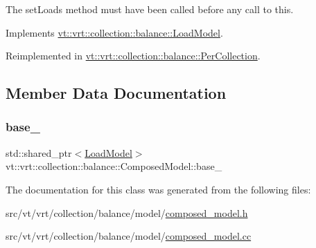 The {\ttfamily set\+Loads} method must have been called before any call to this. 

Implements \hyperlink{structvt_1_1vrt_1_1collection_1_1balance_1_1_load_model_a4f1c6fb5d7d7a0b147755f025b1d5f5c}{vt\+::vrt\+::collection\+::balance\+::\+Load\+Model}.



Reimplemented in \hyperlink{structvt_1_1vrt_1_1collection_1_1balance_1_1_per_collection_a2b41fbbe2b684654f8dbfd9207b77501}{vt\+::vrt\+::collection\+::balance\+::\+Per\+Collection}.



\subsection{Member Data Documentation}
\mbox{\label{classvt_1_1vrt_1_1collection_1_1balance_1_1_composed_model_a8a2a6b2d5e79a7c02002132913c9ae55}} 
\subsubsection{\texorpdfstring{base\+\_\+}{base\_}}
{\footnotesize\ttfamily std\+::shared\+\_\+ptr$<$\hyperlink{structvt_1_1vrt_1_1collection_1_1balance_1_1_load_model}{Load\+Model}$>$ vt\+::vrt\+::collection\+::balance\+::\+Composed\+Model\+::base\+\_\+\hspace{0.3cm}{\ttfamily [private]}}



The documentation for this class was generated from the following files\+:\begin{DoxyCompactItemize}
\item 
src/vt/vrt/collection/balance/model/\hyperlink{composed__model_8h}{composed\+\_\+model.\+h}\item 
src/vt/vrt/collection/balance/model/\hyperlink{composed__model_8cc}{composed\+\_\+model.\+cc}\end{DoxyCompactItemize}
